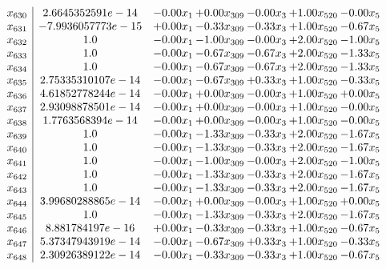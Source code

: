 \documentclass[8pt]{article}
\begin{document}
\[\begin{array}{c| c c@{\hskip 2pt} c@{\hskip 2pt} c@{\hskip 2pt} c@{\hskip 2pt} c@{\hskip 2pt} }
 x_{630}   &  2.6645352591e-14 & -0.00 x_{1} & +  0.00 x_{309} & -0.00 x_{3} & +  1.00 x_{520} & -0.00 x_{5}\\
 x_{631}   &  -7.9936057773e-15 & +  0.00 x_{1} & -0.33 x_{309} & -0.33 x_{3} & +  1.00 x_{520} & -0.67 x_{5}\\
 x_{632}   &  1.0 & -0.00 x_{1} & -1.00 x_{309} & -0.00 x_{3} & +  2.00 x_{520} & -1.00 x_{5}\\
 x_{633}   &  1.0 & -0.00 x_{1} & -0.67 x_{309} & -0.67 x_{3} & +  2.00 x_{520} & -1.33 x_{5}\\
 x_{634}   &  1.0 & -0.00 x_{1} & -0.67 x_{309} & -0.67 x_{3} & +  2.00 x_{520} & -1.33 x_{5}\\
 x_{635}   &  2.75335310107e-14 & -0.00 x_{1} & -0.67 x_{309} & +  0.33 x_{3} & +  1.00 x_{520} & -0.33 x_{5}\\
 x_{636}   &  4.61852778244e-14 & -0.00 x_{1} & +  0.00 x_{309} & -0.00 x_{3} & +  1.00 x_{520} & +  0.00 x_{5}\\
 x_{637}   &  2.93098878501e-14 & -0.00 x_{1} & +  0.00 x_{309} & -0.00 x_{3} & +  1.00 x_{520} & -0.00 x_{5}\\
 x_{638}   &  1.7763568394e-14 & -0.00 x_{1} & +  0.00 x_{309} & -0.00 x_{3} & +  1.00 x_{520} & -0.00 x_{5}\\
 x_{639}   &  1.0 & -0.00 x_{1} & -1.33 x_{309} & -0.33 x_{3} & +  2.00 x_{520} & -1.67 x_{5}\\
 x_{640}   &  1.0 & -0.00 x_{1} & -1.33 x_{309} & -0.33 x_{3} & +  2.00 x_{520} & -1.67 x_{5}\\
 x_{641}   &  1.0 & -0.00 x_{1} & -1.00 x_{309} & -0.00 x_{3} & +  2.00 x_{520} & -1.00 x_{5}\\
 x_{642}   &  1.0 & -0.00 x_{1} & -1.33 x_{309} & -0.33 x_{3} & +  2.00 x_{520} & -1.67 x_{5}\\
 x_{643}   &  1.0 & -0.00 x_{1} & -1.33 x_{309} & -0.33 x_{3} & +  2.00 x_{520} & -1.67 x_{5}\\
 x_{644}   &  3.99680288865e-14 & -0.00 x_{1} & +  0.00 x_{309} & -0.00 x_{3} & +  1.00 x_{520} & +  0.00 x_{5}\\
 x_{645}   &  1.0 & -0.00 x_{1} & -1.33 x_{309} & -0.33 x_{3} & +  2.00 x_{520} & -1.67 x_{5}\\
 x_{646}   &  8.881784197e-16 & +  0.00 x_{1} & -0.33 x_{309} & -0.33 x_{3} & +  1.00 x_{520} & -0.67 x_{5}\\
 x_{647}   &  5.37347943919e-14 & -0.00 x_{1} & -0.67 x_{309} & +  0.33 x_{3} & +  1.00 x_{520} & -0.33 x_{5}\\
 x_{648}   &  2.30926389122e-14 & -0.00 x_{1} & -0.33 x_{309} & -0.33 x_{3} & +  1.00 x_{520} & -0.67 x_{5}\\

\end{array}\]
\end{document}
